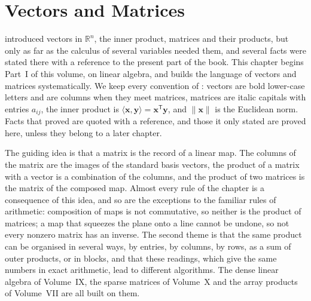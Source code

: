 \chapter{Vectors and Matrices}
\label{ch:vectors-matrices}


 introduced vectors in $\mathbb R^n$, the inner product, matrices and their products, but only as far as the calculus of several variables needed them, and several facts were stated there with a reference to the present part of the book. This chapter begins Part~I of this volume, on linear algebra, and builds the language of vectors and matrices systematically. We keep every convention of : vectors are bold lower-case letters and are columns when they meet matrices, matrices are italic capitals with entries $a_{ij}$, the inner product is $\langle\mathbf x,\mathbf y\rangle=\mathbf x^{\mathsf T}\mathbf y$, and $\|\mathbf x\|$ is the Euclidean norm. Facts that  proved are quoted with a reference, and those it only stated are proved here, unless they belong to a later chapter.

The guiding idea is that a matrix is the record of a linear map. The columns of the matrix are the images of the standard basis vectors, the product of a matrix with a vector is a combination of the columns, and the product of two matrices is the matrix of the composed map. Almost every rule of the chapter is a consequence of this idea, and so are the exceptions to the familiar rules of arithmetic: composition of maps is not commutative, so neither is the product of matrices; a map that squeezes the plane onto a line cannot be undone, so not every nonzero matrix has an inverse. The second theme is that the same product can be organised in several ways, by entries, by columns, by rows, as a sum of outer products, or in blocks, and that these readings, which give the same numbers in exact arithmetic, lead to different algorithms. The dense linear algebra of Volume~IX, the sparse matrices of Volume~X and the array products of Volume~VII are all built on them.

